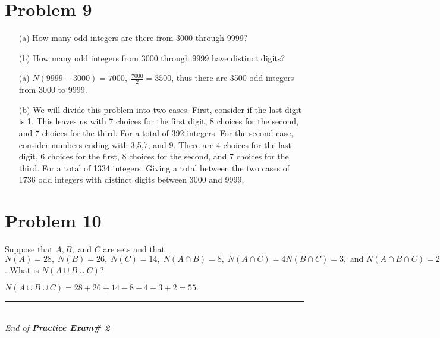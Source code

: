 \documentclass[12pt]{article}
\newcommand{\hwNumber}{\# 2}
\newcommand{\hwTitle}{Practice Exam}
\begin{document}
\section*{Problem 9}

\begin{tcolorbox}[colback=gray!10, colframe=black, title=Given]
	\begin{enumerate}
		\item [(a)] How many odd integers are there from 3000 through 9999?
		\item [(b)] How many odd integers from 3000 through 9999 have distinct digits?
	\end{enumerate}
\end{tcolorbox}

\begin{tcolorbox}[colback=yellow!20, colframe=black, title=Solution]
	\begin{enumerate}
		\item [(a)] $N(9999-3000)=7000,\; \frac{7000}{2}=3500$, thus there are 3500 odd integers from 3000 to 9999.
		\item [(b)] We will divide this problem into two cases. First, consider if the last digit is 1.
		      This leaves us with 7 choices for the first digit, 8 choices for the second, and 7 choices for the third.
		      For a total of 392 integers. For the second case, consider numbers ending with 3,5,7, and 9.
		      There are 4 choices for the last digit, 6 choices for the first, 8 choices for the second, and 7 choices for the third.
		      For a total of 1334 integers. Giving a total between the two cases of 1736 odd integers with distinct digits
		      between 3000 and 9999.
	\end{enumerate}
\end{tcolorbox}
\section*{Problem 10}

\begin{tcolorbox}[colback=gray!10, colframe=black, title=Given]
	Suppose that $A,B,\text{ and }C$ are sets and that $N(A)=28,\; N(B)=26,\; N(C)=14,\;N(A\cap B)=8,\; N(A\cap C)=4
		N(B\cap C)=3,\text{ and }N(A\cap B\cap C)=2$. What is $N(A\cup B\cup C)$?
\end{tcolorbox}

\begin{tcolorbox}[colback=yellow!20, colframe=black, title=Solution]
	$N(A\cup B\cup C)=28+26+14-8-4-3+2=55.$
\end{tcolorbox}



\vfill
\begin{center}
	\rule{0.5\linewidth}{0.5pt}\\
	\textit{End of \textbf{\hwTitle \space \hwNumber}}
\end{center}
\end{document}
